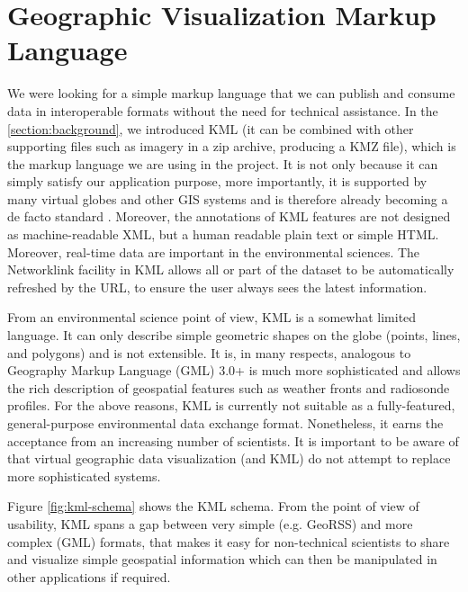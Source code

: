 \section{Geographic Visualization Markup Language}

We were looking for a simple markup language that we can publish and consume data  in interoperable formats without the need for technical assistance. In the \ref{section:background}, we introduced KML (it can be combined with other supporting files such as imagery in a zip archive, producing a KMZ file), which is the markup language we are using in the project. It is not only because it can simply satisfy our application purpose, more importantly, it is supported by many virtual globes and other GIS systems and is therefore already becoming a de facto standard \cite{blower.sharing-visualizing.2007}. Moreover, the annotations of KML features are not designed as machine-readable XML, but a human readable plain text or simple HTML. Moreover, real-time data are important in the environmental sciences. The Networklink facility in KML allows all or part of the dataset to be automatically refreshed by the URL, to ensure the user always sees the latest information.

From an environmental science point of view, KML is a somewhat limited language. It can only describe simple geometric shapes on the globe (points, lines, and polygons) and is not extensible. It is, in many respects, analogous to Geography Markup Language (GML) 3.0+ is much more sophisticated and allows the rich description of geospatial features such as weather fronts and radiosonde profiles. For the above reasons, KML is currently not suitable as a fully-featured, general-purpose environmental data exchange format. Nonetheless, it earns the acceptance from an increasing number of scientists. It is important to be aware of that virtual geographic data visualization (and KML) do not attempt to replace more sophisticated systems. 

Figure \ref{fig:kml-schema} shows the KML schema. From the point of view of usability, KML spans a gap between very simple (e.g. GeoRSS) and more complex (GML) formats, that makes it easy for non-technical scientists to share and visualize simple geospatial information which can then be manipulated in other applications if required. 

